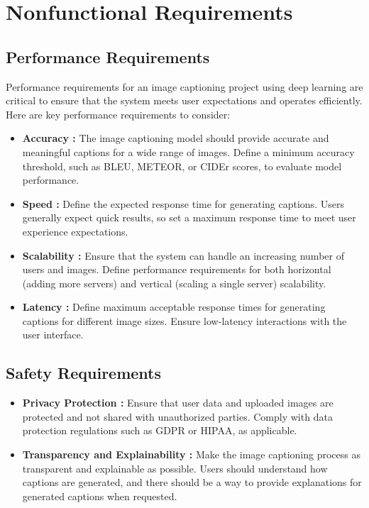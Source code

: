 \documentclass[oneside,a4paper,12pt]{report}
\begin{document}
\section{Nonfunctional Requirements}  
\subsection{Performance Requirements} 
Performance requirements for an image captioning project using deep learning are critical to ensure that the system meets user expectations and operates efficiently. Here are key performance requirements to consider:
\begin{itemize}


\item \textbf{Accuracy : }The image captioning model should provide accurate and meaningful captions for a wide range of images. Define a minimum accuracy threshold, such as BLEU, METEOR, or CIDEr scores, to evaluate model performance.
\item \textbf{Speed : }Define the expected response time for generating captions. Users generally expect quick results, so set a maximum response time to meet user experience expectations.
\item \textbf{Scalability : }Ensure that the system can handle an increasing number of users and images. Define performance requirements for both horizontal (adding more servers) and vertical (scaling a single server) scalability.
\item \textbf{Latency : }Define maximum acceptable response times for generating captions for different image sizes. Ensure low-latency interactions with the user interface.
\end{itemize}
\subsection{Safety Requirements}
\begin{itemize}
\item \textbf{Privacy Protection : }Ensure that user data and uploaded images are protected and not shared with unauthorized parties. Comply with data protection regulations such as GDPR or HIPAA, as applicable.
\item \textbf{Transparency and Explainability : }Make the image captioning process as transparent and explainable as possible. Users should understand how captions are generated, and there should be a way to provide explanations for generated captions when requested.

\end{itemize}
\end{document}
